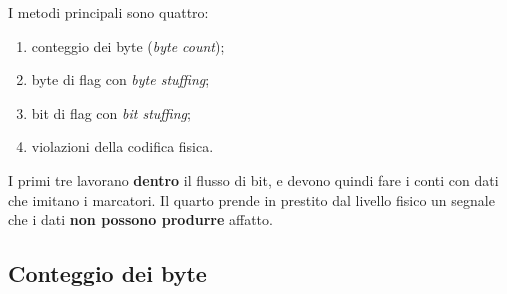 I metodi principali sono quattro:

\begin{enumerate}
    \item conteggio dei byte (\emph{byte count});
    \item byte di flag con \emph{byte stuffing};
    \item bit di flag con \emph{bit stuffing};
    \item violazioni della codifica fisica.
\end{enumerate}

I primi tre lavorano \textbf{dentro} il flusso di bit, e devono quindi fare i conti con dati che imitano i marcatori. Il quarto prende
in prestito dal livello fisico un segnale che i dati \textbf{non possono produrre} affatto.

\subsection{Conteggio dei byte}



